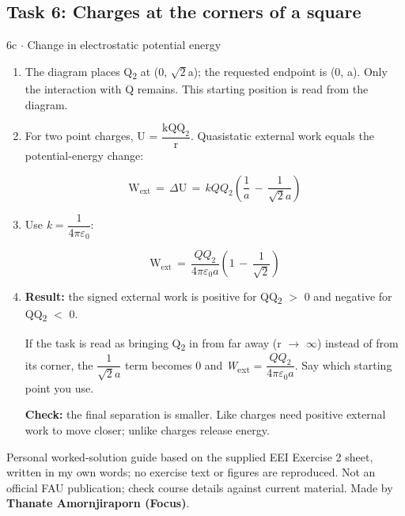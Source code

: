 \documentclass[11pt]{article}
\begin{document}
\begin{keepsection}\subsection{Task 6: Charges at the corners of a square}

\begin{workedbox}{6c \ensuremath{\cdot} Change in electrostatic potential energy}
\begin{enumerate}
\item The diagram places Q\textsubscript{2} at (0, \ensuremath{\sqrt{2}}a); the requested endpoint is (0, a). Only the interaction with Q remains. This starting position is read from the diagram.
\item {}
For two point charges, U = {\small\ensuremath{\dfrac{\text{kQQ}_{2}}{\mathrm{r}}}}. Quasistatic external work equals the potential-energy change:

\begin{equation*}\mathrm{W}_{\text{ext}}\, =\, Δ\mathrm{U}\, =\, {kQQ}_{2}\left(\dfrac{1}{{a}}\, -\, \dfrac{1}{\sqrt{2}{a}}\right)\end{equation*}
\item {}
Use \textit{k} = {\small\ensuremath{\dfrac{1}{4π{ε}_{0}}}}:

\begin{equation*}\mathrm{W}_{\text{ext}}\, =\, \dfrac{{QQ}_{2}}{4π{ε}_{0}{a}}\left(1\, -\, \dfrac{1}{\sqrt{2}}\right)\end{equation*}
\item {}
\textbf{Result:} the signed external work is positive for QQ\textsubscript{2} \ensuremath{>} 0 and negative for QQ\textsubscript{2} \ensuremath{<} 0.

If the task is read as bringing Q\textsubscript{2} in from far away (r \ensuremath{\to} \ensuremath{\infty}) instead of from its corner, the {\small\ensuremath{\dfrac{1}{\sqrt{2}{a}}}} term becomes 0 and \textit{W}\textsubscript{ext} = {\small\ensuremath{\dfrac{{QQ}_{2}}{4πε_{0}{a}}}}. Say which starting point you use.

\textbf{Check:} the final separation is smaller. Like charges need positive external work to move closer; unlike charges release energy.
\end{enumerate}
\end{workedbox}

\end{keepsection}

\vfill{\small Personal worked-solution guide based on the supplied EEI Exercise 2 sheet, written in my own words; no exercise text or figures are reproduced. Not an official FAU publication; check course details against current material. Made by \textbf{Thanate Amornjiraporn (Focus)}.}
\end{document}
